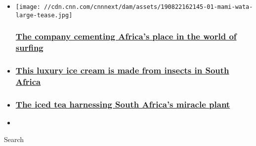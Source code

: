 \begin{itemize}
\item
  \href{/2019/08/26/business/mami-wata-surfing-intl/index.html}{}

  \texttt{[image: //cdn.cnn.com/cnnnext/dam/assets/190822162145-01-mami-wata-large-tease.jpg]}

  \hypertarget{the-company-cementing-africas-place-in-the-world-of-surfing}{%
  \subsubsection{\texorpdfstring{\href{/2019/08/26/business/mami-wata-surfing-intl/index.html}{The
  company cementing Africa's place in the world of
  surfing}}{The company cementing Africa's place in the world of surfing}}\label{the-company-cementing-africas-place-in-the-world-of-surfing}}
\item
  \hypertarget{this-luxury-ice-cream-is-made-from-insects-in-south-africa}{%
  \subsubsection{\texorpdfstring{\href{/2019/07/25/business/gourmet-grubb-insect-ice-cream-intl/index.html}{This
  luxury ice cream is made from insects in South
  Africa}}{This luxury ice cream is made from insects in South Africa}}\label{this-luxury-ice-cream-is-made-from-insects-in-south-africa}}
\item
  \hypertarget{the-iced-tea-harnessing-south-africas-miracle-plant}{%
  \subsubsection{\texorpdfstring{\href{/videos/business/2019/05/31/bos-iced-tea-itm-south-africa-lon-orig.cnn-business}{The
  iced tea harnessing South Africa's miracle
  plant}}{The iced tea harnessing South Africa's miracle plant}}\label{the-iced-tea-harnessing-south-africas-miracle-plant}}
\end{itemize}

\begin{itemize}
\item
\end{itemize}

Search

